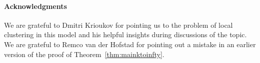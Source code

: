 \documentclass[a4paper,10pt]{article}
\newcommand{\1}{\mathds{1}}								%
\newcommand{\BL}[1]{{{\color{blue} #1}}}
\newcommand{\TM}[1]{\BL{{\bf Tobias:} #1}}
\begin{document}
\newpage

\tableofcontents

\newpage



















%
%

\paragraph{Acknowledgments} We are grateful to Dmitri Krioukov for pointing us to the problem of local clustering in this model 
and his helpful insights during discussions of the topic. We are grateful to Remco van der Hofstad for pointing out a mistake in an earlier version of the proof of Theorem~\ref{thm:mainktoinfty}.






\end{document}
